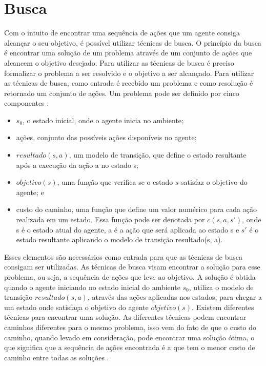 \chapter{\label{chap:busca}Busca}

Com o intuito de encontrar uma sequência de ações que um agente consiga alcançar o seu objetivo, é possível utilizar técnicas de busca. 
O princípio da busca é encontrar uma solução de um problema através de um conjunto de ações que alcancem o objetivo desejado. 
Para utilizar as técnicas de busca é preciso formalizar o problema a ser resolvido e o objetivo a ser alcançado. 
Para utilizar as técnicas de busca, como entrada é recebido um problema e como resolução é retornado um conjunto de ações. 
Um problema pode ser definido por cinco componentes \cite{intelligence2003modern}: 

\begin{itemize}
	\item $s_{0}$, o estado inicial, onde o agente inicia no ambiente;
	\item ações, conjunto das possíveis ações disponíveis no agente;
	\item $resultado(s, a)$, um modelo de transição, que define o estado resultante após a execução da ação a no estado s;
	\item $objetivo(s)$, uma função que verifica se o estado $s$ satisfaz o objetivo do agente; e
	\item custo do caminho, uma função que define um valor numérico para cada ação realizada em um estado. Essa função pode ser denotada por $c(s, a, s')$, onde s é o estado atual do agente, a é a ação que será aplicada ao estado s e $s'$ é o estado resultante aplicando o modelo de transição resultado(s, a). 
\end{itemize}   


Esses elementos são necessários como entrada para que as técnicas de busca consigam ser utilizadas. 
As técnicas de busca visam encontrar a solução para esse problema, ou seja, a sequência de ações que leve ao objetivo.  
A solução é obtida quando o agente iniciando no estado inicial do ambiente $s_{0}$, utiliza o modelo de transição $resultado(s, a)$, através das ações aplicadas nos estados, para chegar a um estado onde satisfaça o objetivo do agente $objetivo(s)$.
Existem diferentes técnicas para encontrar uma solução. 
As diferentes técnicas podem encontrar caminhos diferentes para o mesmo problema, isso vem do fato de que o custo do caminho, quando levado em consideração, pode encontrar uma solução ótima, o que significa que a sequência de ações encontrada é a que tem o menor custo de caminho entre todas as soluções \cite{intelligence2003modern}.

